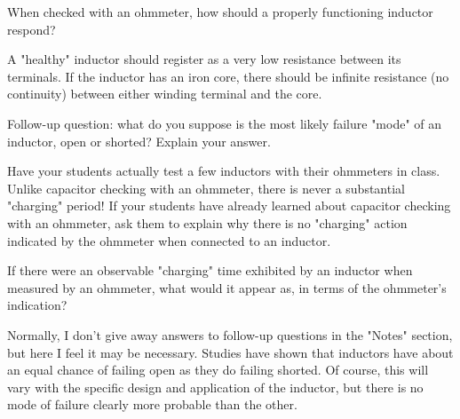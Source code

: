 

When checked with an ohmmeter, how should a properly functioning inductor respond?







A "healthy" inductor should register as a very low resistance between its terminals.  If the inductor has an iron core, there should be infinite resistance (no continuity) between either winding terminal and the core.

\vskip 10pt

Follow-up question: what do you suppose is the most likely failure "mode" of an inductor, open or shorted?  Explain your answer.







Have your students actually test a few inductors with their ohmmeters in class.  Unlike capacitor checking with an ohmmeter, there is never a substantial "charging" period!  If your students have already learned about capacitor checking with an ohmmeter, ask them to explain why there is no "charging" action indicated by the ohmmeter when connected to an inductor.

If there were an observable "charging" time exhibited by an inductor when measured by an ohmmeter, what would it appear as, in terms of the ohmmeter's indication?

Normally, I don't give away answers to follow-up questions in the "Notes" section, but here I feel it may be necessary.  Studies have shown that inductors have about an equal chance of failing open as they do failing shorted.  Of course, this will vary with the specific design and application of the inductor, but there is no mode of failure clearly more probable than the other.




